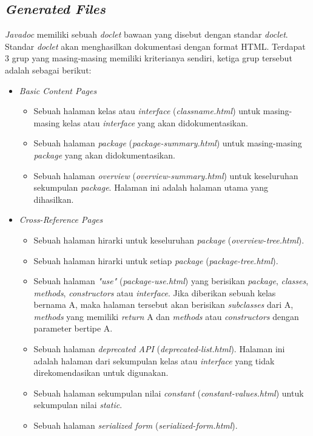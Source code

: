 \subsection{\textit{Generated Files}}
\label{sec:generated-files}
{\it Javadoc} memiliki sebuah {\it doclet} bawaan yang disebut dengan standar {\it doclet}. Standar {\it doclet} akan menghasilkan dokumentasi dengan format HTML. Terdapat 3 grup yang masing-masing memiliki kriterianya sendiri, ketiga grup tersebut adalah sebagai berikut:
\begin{itemize}
	\item {\it Basic Content Pages}
	\begin{itemize}
		\item Sebuah halaman kelas atau {\it interface} ({\it classname.html}) untuk masing-masing kelas atau {\it interface} yang akan didokumentasikan.
		\item Sebuah halaman {\it package} ({\it package-summary.html}) untuk masing-masing {\it package} yang akan didokumentasikan.
		\item Sebuah halaman {\it overview} ({\it overview-summary.html}) untuk keseluruhan sekumpulan {\it package}. Halaman ini adalah halaman utama yang dihasilkan.
	\end{itemize}
	\item {\it Cross-Reference Pages}
	\begin{itemize}
		\item Sebuah halaman hirarki untuk keseluruhan {\it package} ({\it overview-tree.html}).
		\item Sebuah halaman hirarki untuk setiap {\it package} ({\it package-tree.html}).
		\item Sebuah halaman {\it "use"} ({\it package-use.html}) yang berisikan {\it package}, {\it classes}, {\it methods}, {\it constructors} atau {\it interface}. Jika diberikan sebuah kelas bernama A, maka halaman tersebut akan berisikan {\it subclasses} dari A, {\it methods} yang memiliki {\it return} A dan {\it methods} atau {\it constructors} dengan parameter bertipe A.
		\item Sebuah halaman {\it deprecated API} ({\it deprecated-list.html}). Halaman ini adalah halaman dari sekumpulan kelas atau {\it interface} yang tidak direkomendasikan untuk digunakan.
		\item Sebuah halaman sekumpulan nilai {\it constant} ({\it constant-values.html}) untuk sekumpulan nilai {\it static}.
		\item Sebuah halaman {\it serialized form} ({\it serialized-form.html}).

\end{itemize}
\end{itemize}
